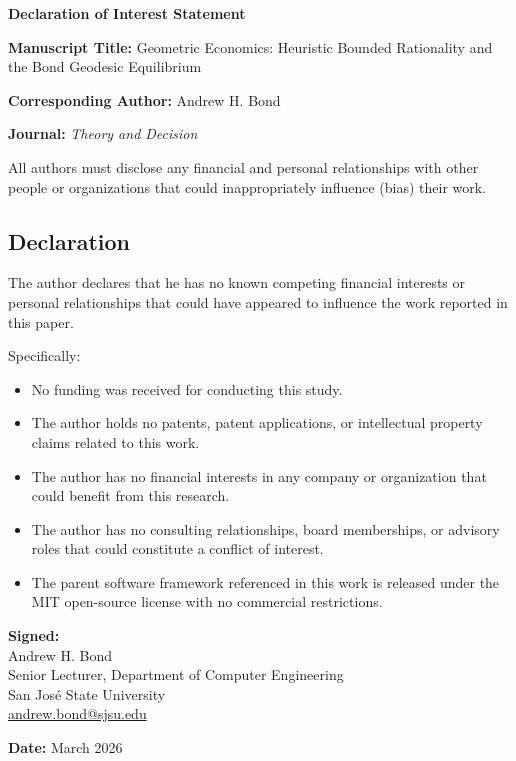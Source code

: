\documentclass[12pt]{article}
\begin{document}
\begin{center}
{\LARGE\bfseries Declaration of Interest Statement}
\end{center}

\bigskip

\noindent\textbf{Manuscript Title:} Geometric Economics: Heuristic Bounded Rationality and the Bond Geodesic Equilibrium

\bigskip

\noindent\textbf{Corresponding Author:} Andrew H. Bond

\bigskip

\noindent\textbf{Journal:} \emph{Theory and Decision}

\bigskip\bigskip

\noindent All authors must disclose any financial and personal relationships with other people or organizations that could inappropriately influence (bias) their work.

\bigskip

\subsection*{Declaration}

The author declares that he has no known competing financial interests or personal relationships that could have appeared to influence the work reported in this paper.

\bigskip

\noindent Specifically:

\begin{itemize}
    \item No funding was received for conducting this study.
    \item The author holds no patents, patent applications, or intellectual property claims related to this work.
    \item The author has no financial interests in any company or organization that could benefit from this research.
    \item The author has no consulting relationships, board memberships, or advisory roles that could constitute a conflict of interest.
    \item The parent software framework referenced in this work is released under the MIT open-source license with no commercial restrictions.
\end{itemize}

\bigskip\bigskip

\noindent\textbf{Signed:}\\[1.5em]
Andrew H. Bond\\
Senior Lecturer, Department of Computer Engineering\\
San Jos\'{e} State University\\
\href{mailto:andrew.bond@sjsu.edu}{andrew.bond@sjsu.edu}

\bigskip

\noindent\textbf{Date:} March 2026
\end{document}
